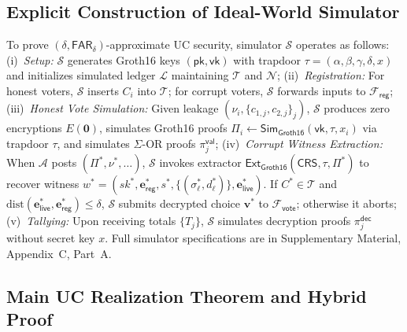 \documentclass[10pt,letterpaper,journal]{IEEEtran}
\begin{document}
\subsection{Explicit Construction of Ideal-World Simulator}
\label{sec:uc-simulator}
To prove $(\delta, \mathsf{FAR}_\delta)$-approximate UC security, simulator $\mathcal{S}$ operates as follows:
(i)~\emph{Setup:} $\mathcal{S}$ generates Groth16 keys $(\mathsf{pk}, \mathsf{vk})$ with trapdoor $\tau = (\alpha, \beta, \gamma, \delta, x)$ and initializes simulated ledger $\mathcal{L}$ maintaining $\mathcal{T}$ and $\mathcal{N}$;
(ii)~\emph{Registration:} For honest voters, $\mathcal{S}$ inserts $C_i$ into $\mathcal{T}$; for corrupt voters, $\mathcal{S}$ forwards inputs to $\mathcal{F}_{\mathsf{reg}}$;
(iii)~\emph{Honest Vote Simulation:} Given leakage $(\nu_i, \{c_{1,j}, c_{2,j}\}_j)$, $\mathcal{S}$ produces zero encryptions $E(\mathbf{0})$, simulates Groth16 proofs $\Pi_i \leftarrow \mathsf{Sim}_{\mathsf{Groth16}}(\mathsf{vk}, \tau, x_i)$ via trapdoor $\tau$, and simulates $\Sigma$-OR proofs $\pi_j^{\mathsf{val}}$;
(iv)~\emph{Corrupt Witness Extraction:} When $\mathcal{A}$ posts $(\Pi^\ast, \nu^\ast, \dots)$, $\mathcal{S}$ invokes extractor $\mathsf{Ext}_{\mathsf{Groth16}}(\mathsf{CRS}, \tau, \Pi^\ast)$ to recover witness $w^\ast = (sk^\ast, \mathbf{e}_{\mathsf{reg}}^\ast, s^\ast, \{(\sigma_\ell^\ast, d_\ell^\ast)\}, \mathbf{e}_{\mathsf{live}}^\ast)$. If $C^\ast \in \mathcal{T}$ and $\mathrm{dist}(\mathbf{e}_{\mathsf{live}}^\ast, \mathbf{e}_{\mathsf{reg}}^\ast) \leq \delta$, $\mathcal{S}$ submits decrypted choice $\mathbf{v}^\ast$ to $\mathcal{F}_{\mathsf{vote}}$; otherwise it aborts;
(v)~\emph{Tallying:} Upon receiving totals $\{T_j\}$, $\mathcal{S}$ simulates decryption proofs $\pi_j^{\mathsf{dec}}$ without secret key $x$. Full simulator specifications are in Supplementary Material, Appendix~C, Part~A.

\subsection{Main UC Realization Theorem and Hybrid Proof}
\label{sec:uc-realization}
\end{document}
